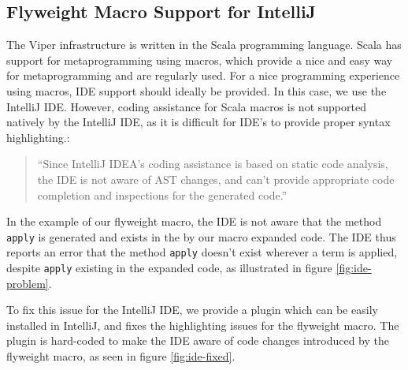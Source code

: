 \documentclass[11pt]{article}
\begin{document}


    \subsection{Flyweight Macro Support for IntelliJ} \label{macro-support-intellij}

    The Viper infrastructure is written in the Scala programming language.
    Scala has support for metaprogramming using macros, which provide
    a nice and easy way for metaprogramming and
    are regularly used. For a nice programming experience
    using macros, IDE support should ideally be provided. In this case, we use the IntelliJ IDE.
    However, coding assistance for Scala macros is not supported natively by the IntelliJ IDE, 
    as it is difficult for IDE's to provide proper syntax highlighting.:

    \begin{quote}
        ``Since IntelliJ IDEA’s coding assistance is based on static code analysis,
        the IDE is not aware of AST changes, and can’t provide appropriate code
        completion and inspections for the generated code.'' \cite{intellij}
    \end{quote}

    In the example of our flyweight macro, the IDE is not aware that
    the method \texttt{apply} is generated and exists in the by our macro
    expanded code. The IDE thus reports an error that the method \texttt{apply}
    doesn't exist
    wherever a term is applied, despite \texttt{apply} existing in the expanded code, as illustrated in figure \ref{fig:ide-problem}.

    To fix this issue for the IntelliJ IDE,
    we provide a plugin which
    can be easily installed in IntelliJ, and fixes the highlighting
    issues for the flyweight macro. The plugin is hard-coded to
    make the IDE aware of code changes introduced by the flyweight
    macro, as seen in figure \ref{fig:ide-fixed}.
    
\end{document}
